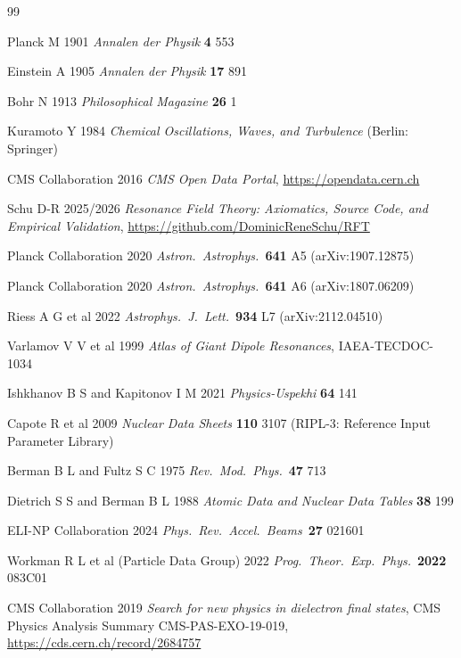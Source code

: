 \documentclass[12pt]{iopart}
\begin{document}
	
	\begin{thebibliography}{99}
		
		Planck M 1901 \textit{Annalen der Physik}
		\textbf{4} 553
		
		Einstein A 1905 \textit{Annalen der Physik}
		\textbf{17} 891
		
		Bohr N 1913
		\textit{Philosophical Magazine}
		\textbf{26} 1
		
		Kuramoto Y 1984 \textit{Chemical Oscillations,
			Waves, and Turbulence}
		(Berlin: Springer)
		
		CMS Collaboration 2016
		\textit{CMS Open Data Portal},
		\url{https://opendata.cern.ch}
		
		Schu D-R 2025/2026
		\textit{Resonance Field Theory: Axiomatics,
			Source Code, and Empirical Validation},
		\url{https://github.com/DominicReneSchu/RFT}
		
		Planck Collaboration 2020
		\textit{Astron.\ Astrophys.}\
		\textbf{641} A5
		(arXiv:1907.12875)
		
		Planck Collaboration 2020
		\textit{Astron.\ Astrophys.}\
		\textbf{641} A6
		(arXiv:1807.06209)
		
		Riess A G et al 2022
		\textit{Astrophys.\ J.\ Lett.}\
		\textbf{934} L7
		(arXiv:2112.04510)
		
		Varlamov V V et al 1999
		\textit{Atlas of Giant Dipole Resonances},
		IAEA-TECDOC-1034
		
		Ishkhanov B S and Kapitonov I M 2021
		\textit{Physics-Uspekhi} \textbf{64} 141
		
		\bibitem{ripl3}
		Capote R et al 2009
		\textit{Nuclear Data Sheets}
		\textbf{110} 3107
		(RIPL-3: Reference Input Parameter Library)
		
		Berman B L and Fultz S C 1975
		\textit{Rev.\ Mod.\ Phys.}\
		\textbf{47} 713
		
		\bibitem{dietrich1988}
		Dietrich S S and Berman B L 1988
		\textit{Atomic Data and Nuclear Data Tables}
		\textbf{38} 199
		
		\bibitem{elinp2024}
		ELI-NP Collaboration 2024
		\textit{Phys.\ Rev.\ Accel.\ Beams}\
		\textbf{27} 021601
		
		Workman R L et al (Particle Data Group) 2022
		\textit{Prog.\ Theor.\ Exp.\ Phys.}\
		\textbf{2022} 083C01
		
		CMS Collaboration 2019
		\textit{Search for new physics in dielectron final states},
		CMS Physics Analysis Summary CMS-PAS-EXO-19-019,
		\url{https://cds.cern.ch/record/2684757}
		
	\end{thebibliography}
	
\end{document}
